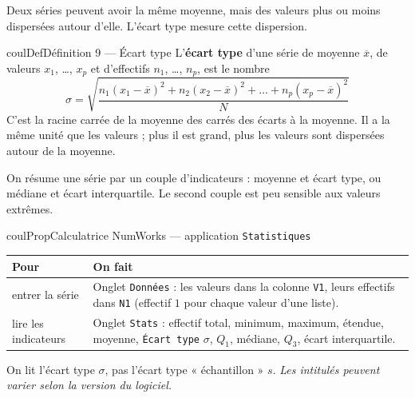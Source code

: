 \documentclass[11pt,a4paper]{article}
\makeatletter
\newcounter{lycee@signet}
\newcommand{\signet}[3][]{\stepcounter{lycee@signet}%
  \edef\lycee@dest{\if\relax\detokenize{#1}\relax
    signet.\arabic{lycee@signet}\else#1\fi}%
  \hypertarget{\lycee@dest}{}\bookmark[level=#2,dest=\lycee@dest]{#3}}
\newenvironment{definitionbox}[1][Définition]%
  {\begin{boitecours}[phantom={\signet{2}{#1}}]{coulDef}{#1}}{\end{boitecours}}
\newenvironment{proprietebox}[1][Propriété]%
  {\begin{boitecours}[phantom={\signet{2}{#1}}]{coulProp}{#1}}{\end{boitecours}}
\makeatother
\begin{document}
Deux séries peuvent avoir la même moyenne, mais des valeurs plus ou moins
dispersées autour d'elle. L'écart type mesure cette dispersion.

\begin{definitionbox}[Définition 9 --- Écart type]
L'\textbf{écart type} d'une série de moyenne $\overline{x}$, de valeurs $x_1$, \ldots,
$x_p$ et d'effectifs $n_1$, \ldots, $n_p$, est le nombre
\[
\sigma=\sqrt{\frac{n_1(x_1-\overline{x})^{2}+n_2(x_2-\overline{x})^{2}+\dots
+n_p(x_p-\overline{x})^{2}}{N}}
\]
C'est la racine carrée de la moyenne des carrés des écarts à la moyenne. Il a la même
unité que les valeurs ; plus il est grand, plus les valeurs sont dispersées autour de
la moyenne.
\end{definitionbox}

\begin{remarquebox}
On résume une série par un couple d'indicateurs : moyenne et écart type, ou médiane
et écart interquartile. Le second couple est peu sensible aux valeurs extrêmes.
\end{remarquebox}

\begin{proprietebox}[Calculatrice NumWorks --- application \texttt{Statistiques}]
\begin{center}
\renewcommand{\arraystretch}{1.3}
\begin{tabular}{|>{\raggedright\arraybackslash}p{4.3cm}|>{\raggedright\arraybackslash}p{12.3cm}|}
\hline
\textbf{Pour} & \textbf{On fait}\\\hline
entrer la série & Onglet \texttt{Données} : les valeurs dans la colonne \texttt{V1},
  leurs effectifs dans \texttt{N1} (effectif $1$ pour chaque valeur d'une
  liste).\\\hline
lire les indicateurs & Onglet \texttt{Stats} : effectif total, minimum, maximum,
  étendue, moyenne, \texttt{Écart type} $\sigma$, $Q_1$, médiane, $Q_3$, écart
  interquartile.\\\hline
\end{tabular}
\end{center}
On lit l'écart type $\sigma$, pas l'écart type « échantillon » $s$.
{\footnotesize\itshape Les intitulés peuvent varier selon la version du logiciel.}
\end{proprietebox}
\end{document}
